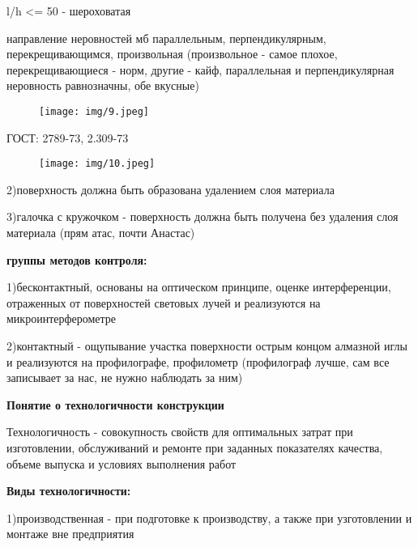{\begin{center}
    \par l/h <= 50 - шероховатая

    \par направление неровностей мб параллельным, перпендикулярным, перекрещивающимся, произвольная (произвольное - самое плохое, перекрещивающиеся - норм, другие - кайф, параллельная и перпендикулярная неровность равнозначны, обе вкусные)

    \begin{figure}[H]
    \centering\texttt{[image: img/9.jpeg]} 
    \end{figure}

    ГОСТ: 2789-73, 2.309-73

    \begin{figure}[H]
    \centering\texttt{[image: img/10.jpeg]} 
    \end{figure}

    \par 2)поверхность должна быть образована удалением слоя материала
    \par 3)галочка с кружочком - поверхность должна быть получена без удаления слоя материала (прям атас, почти Анастас)
    
    \par \textbf{группы методов контроля:}
    \par 1)бесконтактный, основаны на оптическом принципе, оценке интерференции, отраженных от поверхностей световых лучей и реализуются на микроинтерферометре 
    \par 2)контактный - ощупывание участка поверхности острым концом алмазной иглы и реализуются на профилографе, профилометр (профилограф лучше, сам все записывает за нас, не нужно наблюдать за ним)

    \par \textbf{Понятие о технологичности конструкции}

    \par Технологичность - совокупность свойств для оптимальных затрат при изготовлении, обслуживаний и ремонте при заданных показателях качества, объеме выпуска и условиях выполнения работ

    \par \textbf{Виды технологичности:}

    \par 1)производственная - при подготовке к производству, а также при узготовлении и монтаже вне предприятия


\end{center}}
